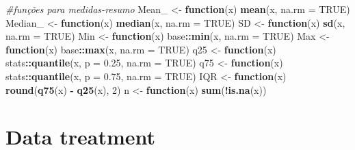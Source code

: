 \documentclass[
]{article}
\newenvironment{Shaded}{\begin{snugshade}}{\end{snugshade}}
\newcommand{\AttributeTok}[1]{\textcolor[rgb]{0.13,0.29,0.53}{#1}}
\newcommand{\CommentTok}[1]{\textcolor[rgb]{0.56,0.35,0.01}{\textit{#1}}}
\newcommand{\ConstantTok}[1]{\textcolor[rgb]{0.56,0.35,0.01}{#1}}
\newcommand{\ControlFlowTok}[1]{\textcolor[rgb]{0.13,0.29,0.53}{\textbf{#1}}}
\newcommand{\DecValTok}[1]{\textcolor[rgb]{0.00,0.00,0.81}{#1}}
\newcommand{\FloatTok}[1]{\textcolor[rgb]{0.00,0.00,0.81}{#1}}
\newcommand{\FunctionTok}[1]{\textcolor[rgb]{0.13,0.29,0.53}{\textbf{#1}}}
\newcommand{\NormalTok}[1]{#1}
\newcommand{\OtherTok}[1]{\textcolor[rgb]{0.56,0.35,0.01}{#1}}
\newcommand{\SpecialCharTok}[1]{\textcolor[rgb]{0.81,0.36,0.00}{\textbf{#1}}}
\begin{document}
\begin{Shaded}
\begin{Highlighting}[]
\CommentTok{\#funções para medidas{-}resumo}
\NormalTok{Mean\_ }\OtherTok{\textless{}{-}} \ControlFlowTok{function}\NormalTok{(x)}
  \FunctionTok{mean}\NormalTok{(x, }\AttributeTok{na.rm =} \ConstantTok{TRUE}\NormalTok{)}
\NormalTok{Median\_ }\OtherTok{\textless{}{-}} \ControlFlowTok{function}\NormalTok{(x)}
  \FunctionTok{median}\NormalTok{(x, }\AttributeTok{na.rm =} \ConstantTok{TRUE}\NormalTok{)}
\NormalTok{SD }\OtherTok{\textless{}{-}} \ControlFlowTok{function}\NormalTok{(x)}
  \FunctionTok{sd}\NormalTok{(x, }\AttributeTok{na.rm =} \ConstantTok{TRUE}\NormalTok{)}
\NormalTok{Min }\OtherTok{\textless{}{-}} \ControlFlowTok{function}\NormalTok{(x)}
\NormalTok{  base}\SpecialCharTok{::}\FunctionTok{min}\NormalTok{(x, }\AttributeTok{na.rm =} \ConstantTok{TRUE}\NormalTok{)}
\NormalTok{Max }\OtherTok{\textless{}{-}} \ControlFlowTok{function}\NormalTok{(x)}
\NormalTok{  base}\SpecialCharTok{::}\FunctionTok{max}\NormalTok{(x, }\AttributeTok{na.rm =} \ConstantTok{TRUE}\NormalTok{)}
\NormalTok{q25 }\OtherTok{\textless{}{-}} \ControlFlowTok{function}\NormalTok{(x)}
\NormalTok{  stats}\SpecialCharTok{::}\FunctionTok{quantile}\NormalTok{(x, }\AttributeTok{p =} \FloatTok{0.25}\NormalTok{, }\AttributeTok{na.rm =} \ConstantTok{TRUE}\NormalTok{)}
\NormalTok{q75 }\OtherTok{\textless{}{-}} \ControlFlowTok{function}\NormalTok{(x)}
\NormalTok{  stats}\SpecialCharTok{::}\FunctionTok{quantile}\NormalTok{(x, }\AttributeTok{p =} \FloatTok{0.75}\NormalTok{, }\AttributeTok{na.rm =} \ConstantTok{TRUE}\NormalTok{)}
\NormalTok{IQR }\OtherTok{\textless{}{-}} \ControlFlowTok{function}\NormalTok{(x)}
  \FunctionTok{round}\NormalTok{(}\FunctionTok{q75}\NormalTok{(x) }\SpecialCharTok{{-}} \FunctionTok{q25}\NormalTok{(x), }\DecValTok{2}\NormalTok{)}
\NormalTok{n }\OtherTok{\textless{}{-}} \ControlFlowTok{function}\NormalTok{(x)}
  \FunctionTok{sum}\NormalTok{(}\SpecialCharTok{!}\FunctionTok{is.na}\NormalTok{(x))}
\end{Highlighting}
\end{Shaded}

\hypertarget{data-treatment}{%
\section{Data treatment}\label{data-treatment}}
\end{document}
